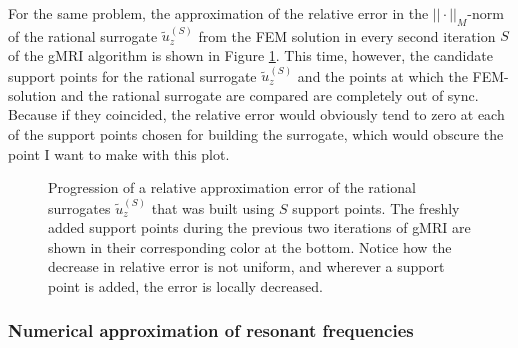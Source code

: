 \documentclass[11pt, a4paper]{article}
\begin{document}
For the same problem, the approximation of the relative error 
in the $||\cdot||_M$-norm of the rational surrogate $\tilde{u}_z^{(S)}$ from the
\acrshort{FEM} solution in every second iteration $S$ of the \acrshort{gMRI} algorithm
is shown in Figure \ref{fig:rectangular-cavity-errorprogression}. This time,
however, the candidate support points for the rational surrogate $\tilde{u}_z^{(S)}$
and the points at which the \acrshort{FEM}-solution and the rational surrogate
are compared are completely out of sync. Because if they coincided, the relative error
would obviously tend to zero at each of the support points chosen for building
the surrogate, which would obscure the point I want to make with this plot.

\begin{figure}[ht]
    \centering
    
    \caption{Progression of a relative approximation error of the rational
    surrogates $\tilde{u}_z^{(S)}$ that was built using $S$ support points.
    The freshly added support points during the previous two iterations of
    \acrshort{gMRI} are shown in their corresponding color at the bottom.
    Notice how the decrease in relative error is not uniform, and wherever a
    support point is added, the error is locally decreased.}
    \label{fig:rectangular-cavity-errorprogression}
\end{figure}

\subsubsection{Numerical approximation of resonant frequencies}
\label{subsubsec:root-finding}
\end{document}
